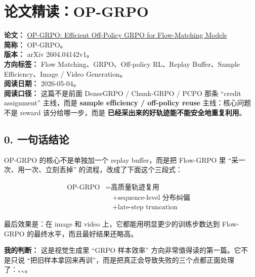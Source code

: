
\section{论文精读：OP-GRPO}

\begin{conceptbox}
\textbf{论文：} \href{https://arxiv.org/abs/2604.04142}{OP-GRPO: Efficient Off-Policy GRPO for Flow-Matching Models}\\
\textbf{简称：} OP-GRPO。\\
\textbf{版本：} arXiv 2604.04142v1。\\
\textbf{方向标签：} Flow Matching、GRPO、Off-policy RL、Replay Buffer、Sample Efficiency、Image / Video Generation。\\
\textbf{阅读日期：} 2026-05-04。\\
\textbf{阅读口径：} 这篇不是前面 DenseGRPO / Chunk-GRPO / PCPO 那条 ``credit assignment'' 主线，而是 \textbf{sample efficiency / off-policy reuse} 主线：核心问题不是 reward 该分给哪一步，而是 \textbf{已经采出来的好轨迹能不能安全地重复利用}。
\end{conceptbox}

\subsection{0. 一句话结论}

OP-GRPO 的核心不是单独加一个 replay buffer，而是把 Flow-GRPO 里 ``采一次、用一次、立刻丢掉'' 的流程，改成了下面这个三段式：

\[
\begin{aligned}
\text{OP-GRPO}
&= \text{高质量轨迹复用}\\
&\quad + \text{sequence-level 分布纠偏}\\
&\quad + \text{late-step truncation}
\end{aligned}
\]

最后效果是：在 image 和 video 上，它都能用明显更少的训练步数达到 Flow-GRPO 的最终水平，而且最好结果还略高。

\begin{summarybox}
\textbf{我的判断：} 这是视觉生成里 ``GRPO 样本效率'' 方向非常值得读的第一篇。它不是只说 ``把旧样本拿回来再训''，而是把真正会导致失败的三个点都正面处理了：、、。
\end{summarybox}

